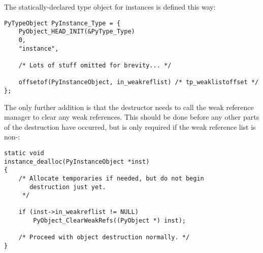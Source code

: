 The statically-declared type object for instances is defined this way:

\begin{verbatim}
PyTypeObject PyInstance_Type = {
    PyObject_HEAD_INIT(&PyType_Type)
    0,
    "instance",

    /* Lots of stuff omitted for brevity... */

    offsetof(PyInstanceObject, in_weakreflist) /* tp_weaklistoffset */
};
\end{verbatim}

The only further addition is that the destructor needs to call the
weak reference manager to clear any weak references.  This should be
done before any other parts of the destruction have occurred, but is
only required if the weak reference list is non-\NULL:

\begin{verbatim}
static void
instance_dealloc(PyInstanceObject *inst)
{
    /* Allocate temporaries if needed, but do not begin
       destruction just yet.
     */

    if (inst->in_weakreflist != NULL)
        PyObject_ClearWeakRefs((PyObject *) inst);

    /* Proceed with object destruction normally. */
}
\end{verbatim}
